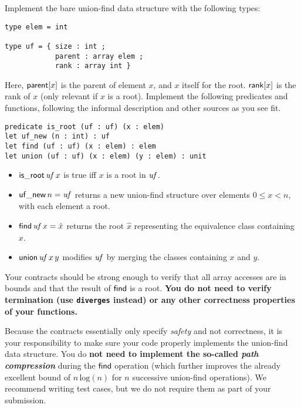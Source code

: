 \documentclass[11pt]{article}
\begin{document}
\begin{task}[25 pts]
\label{task:bare}
  Implement the bare union-find data structure with the following
  types:
\begin{lstlisting}
type elem = int

type uf = { size : int ;
            parent : array elem ;
            rank : array int }
\end{lstlisting}
Here, $\mathsf{parent}[x]$ is the parent of element $x$, and $x$ itself for
the root. $\mathsf{rank}[x]$ is the rank of $x$ (only relevant if $x$ is a
root).  Implement the following predicates and functions,
following the informal description and other sources as you see fit.

\begin{lstlisting}
predicate is_root (uf : uf) (x : elem)
let uf_new (n : int) : uf
let find (uf : uf) (x : elem) : elem
let union (uf : uf) (x : elem) (y : elem) : unit
\end{lstlisting}

\begin{itemize}
\item $\mathsf{is\_root}\, \mathit{uf}\, x$ is true iff $x$ is a root in $\mathit{uf}$.
\item $\mathsf{uf\_new}\, n = \mathit{uf}$ returns a new union-find structure
  over elements $0 \leq x < n$, with each element a root.
\item $\mathsf{find}\, \mathit{uf}\, x = \hat{x}$ returns the root $\hat{x}$ representing
  the equivalence class containing $x$.
\item $\mathsf{union}\, \mathit{uf}\, x\, y$ modifies $\mathit{uf}$ by merging
  the classes containing $x$ and $y$.
\end{itemize}

Your contracts should be strong enough to verify that all array
accesses are in bounds and that the result of $\mathsf{find}$ is a root.
\textbf{You do not need to verify termination (use \texttt{diverges} instead)
or any other correctness properties of your functions.}

Because the contracts essentially only specify \emph{safety} and not
correctness, it is your responsibility to make sure your code properly
implements the union-find data structure.  You do \textbf{not need to
  implement the so-called \emph{path compression}} during the $\mathsf{find}$
operation (which further improves the already excellent bound of
$n\,\mathrm{log}(n)$ for $n$ successive union-find operations).  We
recommend writing test cases, but we do not require them as part of your
submission.
\end{task}
\end{document}
